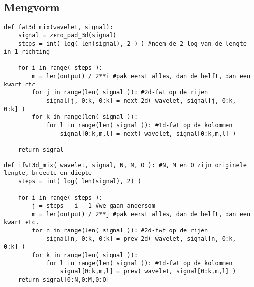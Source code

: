 \subsection{Mengvorm}
\begin{lstlisting}[caption=De mengvorm in 3 dimensies]
def fwt3d_mix(wavelet, signal):
	signal = zero_pad_3d(signal)
	steps = int( log( len(signal), 2 ) ) #neem de 2-log van de lengte in 1 richting
	
	for i in range( steps ):
		m = len(output) / 2**i #pak eerst alles, dan de helft, dan een kwart etc.
		for j in range(len( signal )): #2d-fwt op de rijen
			signal[j, 0:k, 0:k] = next_2d( wavelet, signal[j, 0:k, 0:k] )
		for k in range(len( signal )):
			for l in range(len( signal )): #1d-fwt op de kolommen
				signal[0:k,m,l] = next( wavelet, signal[0:k,m,l] )

	return signal
\end{lstlisting}
\begin{lstlisting}[caption=De omgekeerde mengvorm in 3 dimensies]
def ifwt3d_mix( wavelet, signal, N, M, O ): #N, M en O zijn originele lengte, breedte en diepte
	steps = int( log( len(signal), 2) )
	
	for i in range( steps ):
		j = steps - i - 1 #we gaan andersom
		m = len(output) / 2**j #pak eerst alles, dan de helft, dan een kwart etc.
		for n in range(len( signal )): #2d-fwt op de rijen
			signal[n, 0:k, 0:k] = prev_2d( wavelet, signal[n, 0:k, 0:k] )
		for k in range(len( signal )):
			for l in range(len( signal )): #1d-fwt op de kolommen
				signal[0:k,m,l] = prev( wavelet, signal[0:k,m,l] )
	return signal[0:N,0:M,0:O]
\end{lstlisting}